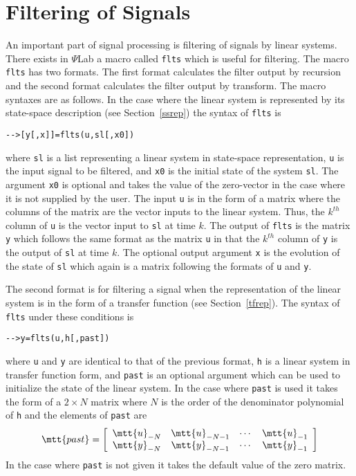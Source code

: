 \section{Filtering of Signals}
\label{filtering}

	An important part of signal processing is filtering of signals
by linear systems.  There
exists in $\Psi$Lab a macro called {\tt flts} which is useful for filtering.
The macro {\tt flts} has two formats.  The first format calculates the filter
output by recursion and the second format calculates the filter output
by transform.  The macro syntaxes are as follows.  In the case where the
linear system is represented by its state-space description (see
Section~\ref{ssrep}) the syntax of {\tt flts} is
\begin{verbatim}
-->[y[,x]]=flts(u,sl[,x0])
\end{verbatim}
where {\tt sl} is a list representing a linear system in state-space
representation, {\tt u} is the input signal to be filtered, and {\tt x0}
is the initial state of the system {\tt sl}.  The argument {\tt x0} is
optional and takes the value of the zero-vector in the case where it
is not supplied by the user.  The input {\tt u} is in the form
of a matrix where the columns of the matrix are the vector inputs
to the linear system.  Thus, the $k^{th}$ column of {\tt u} is
the vector input to {\tt sl} at time $k$.  The output of {\tt flts}
is the matrix {\tt y} which follows the same format as the matrix {\tt u}
in that the $k^{th}$ column of {\tt y} is the output of {\tt sl} at time
$k$.  The optional output argument {\tt x} is the evolution of the state
of {\tt sl} which again is a matrix following the formats of {\tt u}
and {\tt y}.

	The second format is for filtering a signal when the representation
of the linear system is in the form of a transfer function 
(see Section~\ref{tfrep}).  The syntax of {\tt flts} under these conditions
is
\begin{verbatim}
-->y=flts(u,h[,past])
\end{verbatim}
where {\tt u} and {\tt y} are identical to that of the previous format,
{\tt h} is a linear system in transfer function form, and {\tt past}
is an optional argument which can be used to initialize the state of 
the linear system.  In the case where {\tt past} is used it takes the
form of a $2\times N$ matrix where $N$ is the order of the denominator
polynomial of {\tt h} and the elements of {\tt past} are
\[
\mtt{ past}=\left[\begin{array}{cccc}
    	\mtt{ u}_{-N}&\mtt{ u}_{-N-1}&\cdots&\mtt{ u}_{-1}\\
    	\mtt{ y}_{-N}&\mtt{ y}_{-N-1}&\cdots&\mtt{ y}_{-1}
        \end{array}\right]
\]
In the case where {\tt past} is not given it takes the default value
of the zero matrix.


